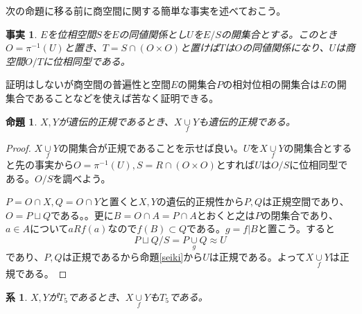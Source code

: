 \documentclass[leqno]{jsarticle}
\newtheorem{prop}[thm]{命題}
\newtheorem{cor}[thm]{系}
\newtheorem{fact}[thm]{事実}
\newcommand{\qt}[2]{#1/\! #2}
\newcommand{\main}{X\underset{f}{\cup} Y}
\begin{document}
次の命題に移る前に商空間に関する簡単な事実を述べておこう。
\begin{fact}
$E$を位相空間$S$を$E$の同値関係とし$U$を$\qt{E}{S}$の開集合とする。このとき$O=\pi^{-1}(U)$と置き、$T=S\cap (O\times O)$と置けば$T$は$O$の同値関係になり、$U$は商空間$\qt{O}{T}$に位相同型である。
\end{fact}
証明はしないが商空間の普遍性と空間$E$の開集合$P$の相対位相の開集合は$E$の開集合であることなどを使えば苦なく証明できる。
\begin{prop}
$X,Y$が遺伝的正規であるとき、$X\underset{f}{\cup} Y$も遺伝的正規である。
\end{prop}
\begin{proof}
$\main$の開集合が正規であることを示せば良い。$U$を$\main$の開集合とすると先の事実から$O=\pi^{-1}(U),S=R\cap (O\times O)$とすれば$U$は$\qt{O}{S}$に位相同型である。$\qt{O}{S}$を調べよう。\par
$P=O\cap X,Q=O\cap Y$と置くと$X,Y$の遺伝的正規性から$P,Q$は正規空間であり、$O=P\sqcup Q$である。。更に$B=O\cap A=P\cap A$とおくと之は$P$の閉集合であり、$a\in A$について$aRf(a)$なので$f(B)\subset Q$である。$g=f|B$と置こう。すると
\[
\qt{P\sqcup Q}{S}=P\underset{g}{\cup}Q\approx U
\]
であり、$P,Q$は正規であるから命題\ref{seiki}から$U$は正規である。よって$\main$は正規である。
\end{proof}

\begin{cor}
$X,Y$が$T_5$であるとき、$X\underset{f}{\cup} Y$も$T_5$である。
\end{cor}
\end{document}
